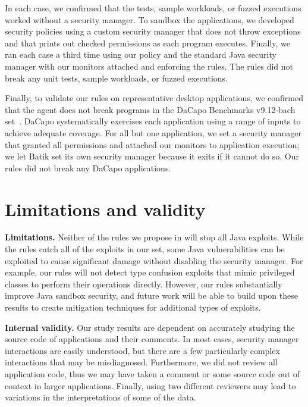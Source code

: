 \documentclass{sig-alternate}
\newcommand{\minisec}[1]{\noindent\textbf{#1}}
\begin{document}
In each case, we confirmed that the tests, sample workloads, or fuzzed executions
worked without a security manager. To sandbox the applications,
we developed security policies using a custom security manager that does not throw exceptions 
and that prints out checked permissions as each program executes. Finally, we
ran each case a third time 
using our policy and the standard Java security manager with our monitors
attached and enforcing the rules. The rules did not break any unit tests, sample
workloads, or fuzzed executions.

Finally, to validate our rules on representative desktop applications, we confirmed that the
agent does not break programs in the DaCapo Benchmarks v9.12-bach set~\cite{dacapo}. 
DaCapo systematically exercises each application using a range of inputs to achieve
adequate coverage. For all but one
application, we set a security manager that granted all
permissions and attached our monitors to application execution; we let Batik set
its own security manager because it exits if it cannot do so. 
Our rules did not break any DaCapo applications.

\section{Limitations and validity}\label{sec:Limitations}

\minisec{Limitations.}
Neither of the rules we propose in  will stop all Java exploits. While the rules
catch all of the exploits in our set, some Java vulnerabilities can
be exploited to cause significant damage without disabling the security
manager. For example, our rules will not detect type confusion exploits
that mimic privileged classes to perform their operations directly.
However, our rules substantially improve Java sandbox security, and
future work will be able to build upon these results to create mitigation
techniques for additional types of exploits.

\minisec{Internal validity.} 
Our study results are dependent on accurately studying the source code of
applications and their comments. In most cases, security manager interactions
are easily understood, but there are a few particularly complex interactions
that may be misdiagnosed. Furthermore, we did not review all application
code, thus we may have taken a comment or some source code out of
context in larger applications. Finally, using two different reviewers
may lead to variations in the interpretations of some of the data. 
\end{document}
